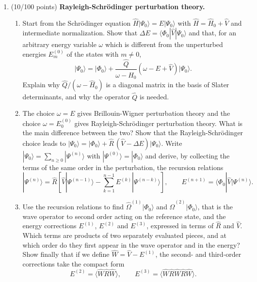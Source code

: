 \documentclass[prc]{revtex4}
\begin{document}
\begin{enumerate}
\item (10/100 points) \textbf{Rayleigh-Schr\"odinger perturbation theory.}
\begin{enumerate}
\item Start from the Schr\"odinger equation
  $\hat{H}|\Psi_0\rangle=E|\Psi_0\rangle$ with
  $\hat{H}=\hat{H}_0+\hat{V}$ and intermediate normalization. Show
  that $\Delta E=\langle\Phi_0|\hat{V}|\Psi_0\rangle$ and that, for an
  arbitrary energy variable $\omega$ which is different from the
  unperturbed energies $E^{(0)}_m$ of the states with $m\neq0$,
\[
|\Psi_0\rangle=|\Phi_0\rangle+\frac{\hat{Q}}{\omega-\hat{H}_0}
\left(\omega-E+\hat{V}\right)|\Psi_0\rangle .
\]
  Explain why $\hat{Q}/(\omega-\hat{H}_0)$ is a diagonal matrix in the
  basis of Slater determinants, and why the operator $\hat{Q}$ is
  needed.
\item The choice $\omega=E$ gives Brillouin-Wigner perturbation theory
  and the choice $\omega=E^{(0)}_0$ gives Rayleigh-Schr\"odinger
  perturbation theory. What is the main difference between the two?
  Show that the Rayleigh-Schr\"odinger choice leads to
  $|\Psi_0\rangle=|\Phi_0\rangle+\hat{R}\,(\hat{V}-\Delta
  E)|\Psi_0\rangle$. Write
  $|\Psi_0\rangle=\sum_{n\geq 0}|\Psi^{(n)}\rangle$ with
  $|\Psi^{(0)}\rangle=|\Phi_0\rangle$ and derive, by collecting the terms
  of the same order in the perturbation, the recursion relations
\begin{equation}
|\Psi^{(n)}\rangle=\hat{R}\left[\hat{V}|\Psi^{(n-1)}\rangle
-\sum_{k=1}^{n-1}E^{(k)}|\Psi^{(n-k)}\rangle\right],\qquad
E^{(n+1)}=\langle\Phi_0|\hat{V}|\Psi^{(n)}\rangle .
\label{eq:recursion}
\end{equation}
\item Use the recursion relations to find
  $\hat{\Omega}^{(1)}|\Phi_0\rangle$ and
  $\hat{\Omega}^{(2)}|\Phi_0\rangle$, that is the wave operator to
  second order acting on the reference state, and the energy
  corrections $E^{(1)}$, $E^{(2)}$ and $E^{(3)}$, expressed in terms
  of $\hat{R}$ and $\hat{V}$. Which terms are products of two
  separately evaluated pieces, and at which order do they first appear
  in the wave operator and in the energy? Show finally that if we
  define $\hat{W}=\hat{V}-E^{(1)}$, the second- and third-order
  corrections take the compact form
\begin{equation}
E^{(2)}=\langle\hat{W}\hat{R}\hat{W}\rangle,\qquad
E^{(3)}=\langle\hat{W}\hat{R}\hat{W}\hat{R}\hat{W}\rangle .
\label{eq:e2e3}
\end{equation}
\end{enumerate}


\end{enumerate}
\end{document}
